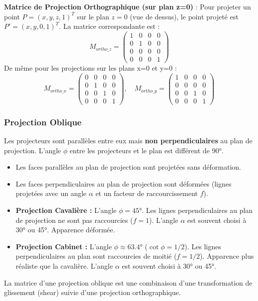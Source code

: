 \documentclass{article}
\begin{document}
\textbf{Matrice de Projection Orthographique (sur plan z=0)} :
Pour projeter un point $P = (x, y, z, 1)^T$ sur le plan $z=0$ (vue de dessus), le point projeté est $P' = (x, y, 0, 1)^T$. La matrice correspondante est :
\[
M_{ortho\_z} = \begin{pmatrix}
1 & 0 & 0 & 0 \\
0 & 1 & 0 & 0 \\
0 & 0 & 0 & 0 \\
0 & 0 & 0 & 1
\end{pmatrix}
\]
De même pour les projections sur les plans x=0 et y=0 :
\[
M_{ortho\_x} = \begin{pmatrix}
0 & 0 & 0 & 0 \\
0 & 1 & 0 & 0 \\
0 & 0 & 1 & 0 \\
0 & 0 & 0 & 1
\end{pmatrix}, \quad
M_{ortho\_y} = \begin{pmatrix}
1 & 0 & 0 & 0 \\
0 & 0 & 0 & 0 \\
0 & 0 & 1 & 0 \\
0 & 0 & 0 & 1
\end{pmatrix}
\]

\subsubsection{Projection Oblique}
Les projecteurs sont parallèles entre eux mais \textbf{non perpendiculaires} au plan de projection. L'angle $\phi$ entre les projecteurs et le plan est différent de 90°.
\begin{itemize}
    \item Les faces parallèles au plan de projection sont projetées sans déformation.
    \item Les faces perpendiculaires au plan de projection sont déformées (lignes projetées avec un angle $\alpha$ et un facteur de raccourcissement $f$).
    \item \textbf{Projection Cavalière :} L'angle $\phi = 45°$. Les lignes perpendiculaires au plan de projection ne sont pas raccourcies ($f=1$). L'angle $\alpha$ est souvent choisi à 30° ou 45°. Apparence déformée.
    \item \textbf{Projection Cabinet :} L'angle $\phi \approx 63.4°$ ($\cot \phi = 1/2$). Les lignes perpendiculaires au plan sont raccourcies de moitié ($f=1/2$). Apparence plus réaliste que la cavalière. L'angle $\alpha$ est souvent choisi à 30° ou 45°.
\end{itemize}
La matrice d'une projection oblique est une combinaison d'une transformation de glissement (shear) suivie d'une projection orthographique.
\end{document}
